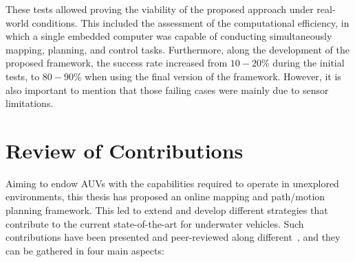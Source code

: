 These tests allowed proving the viability of the proposed approach under
real-world conditions. This included the assessment of the computational
efficiency, in which a single embedded computer was capable of conducting
simultaneously mapping, planning, and control tasks. Furthermore, along the
development of the proposed framework, the success rate increased from $10-20\%$
during the initial tests, to $80-90\%$ when using the final version of the
framework. However, it is also important to mention that those failing cases
were mainly due to sensor limitations.

\section{Review of Contributions}

Aiming to endow \acp{AUV} with the capabilities required to operate in
unexplored environments, this thesis has proposed an online mapping and
path/motion planning framework. This led to extend and develop different
strategies that contribute to the current state-of-the-art for underwater
vehicles. Such contributions have been presented and peer-reviewed along
different~, and they can be gathered in four main
aspects:

